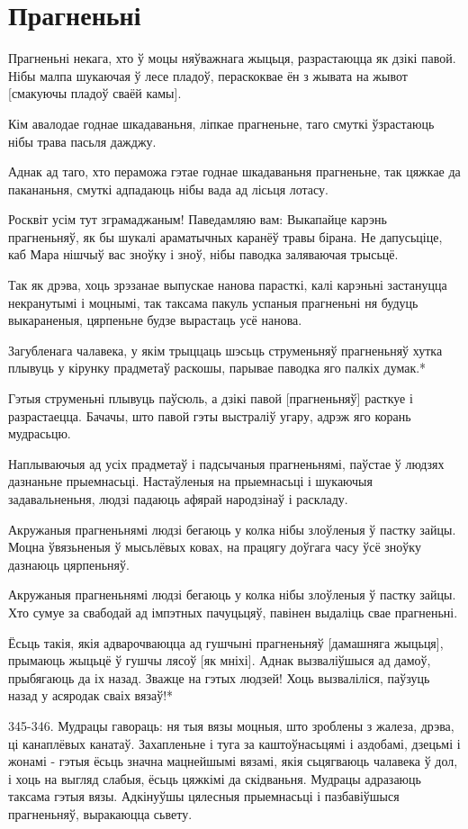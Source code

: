 \documentclass{article}
\begin{document}
\section{Прагненьні}

Прагненьні некага, хто ў моцы няўважнага жыцьця, разрастаюцца як
дзікі павой. Нібы малпа шукаючая ў лесе пладоў, пераскоквае ён з жывата
на жывот {[}смакуючы пладоў сваёй камы{]}.

Кім авалодае годнае шкадаваньня, ліпкае прагненьне, таго смуткі
ўзрастаюць нібы трава пасьля дажджу.

Аднак ад таго, хто пераможа гэтае годнае шкадаваньня прагненьне,
так цяжкае да пакананьня, смуткі адпадаюць нібы вада ад лісьця лотасу.

Росквіт усім тут зграмаджаным! Паведамляю вам: Выкапайце карэнь
прагненьняў, як бы шукалі араматычных каранёў травы бірана. Не
дапусьціце, каб Мара нішчыў вас зноўку і зноў, нібы паводка заляваючая
трысьцё.

Так як дрэва, хоць зрэзанае выпускае нанова парасткі, калі карэньні
застануцца некранутымі і моцнымі, так таксама пакуль успаныя прагненьні
ня будуць выкараненыя, цярпеньне будзе вырастаць усё нанова.

Загубленага чалавека, у якім трыццаць шэсьць струменьняў
прагненьняў хутка плывуць у кірунку прадметаў раскошы, парывае паводка
яго палкіх думак.*

Гэтыя струменьні плывуць паўсюль, а дзікі павой {[}прагненьняў{]}
расткуе і разрастаецца. Бачачы, што павой гэты выстраліў угару, адрэж
яго корань мудрасьцю.

Наплываючыя ад усіх прадметаў і падсычаныя прагненьнямі, паўстае ў
людзях дазнаньне прыемнасьці. Настаўленыя на прыемнасьці і шукаючыя
задавальненьня, людзі падаюць афярай народзінаў і раскладу.

Акружаныя прагненьнямі людзі бегаюць у колка нібы злоўленыя ў
пастку зайцы. Моцна ўвязьненыя ў мысьлёвых ковах, на працягу доўгага
часу ўсё зноўку дазнаюць цярпеньняў.

Акружаныя прагненьнямі людзі бегаюць у колка нібы злоўленыя ў
пастку зайцы. Хто сумуе за свабодай ад імпэтных пачуцьцяў, павінен
выдаліць свае прагненьні.

Ёсьць такія, якія адварочваюцца ад гушчыні прагненьняў {[}дамашняга
жыцьця{]}, прымаюць жыцьцё ў гушчы лясоў {[}як мніхі{]}. Аднак
вызваліўшыся ад дамоў, прыбягаюць да іх назад. Зважце на гэтых людзей!
Хоць вызваліліся, паўзуць назад у асяродак сваіх вязаў!*

345-346. Мудрацы гавораць: ня тыя вязы моцныя, што зроблены з жалеза,
дрэва, ці канаплёвых канатаў. Захапленьне і туга за каштоўнасьцямі і
аздобамі, дзецьмі і жонамі - гэтыя ёсьць значна мацнейшымі вязамі, якія
сьцягваюць чалавека ў дол, і хоць на выгляд слабыя, ёсьць цяжкімі да
скідваньня. Мудрацы адразаюць таксама гэтыя вязы. Адкінуўшы цялесныя
прыемнасьці і пазбавіўшыся прагненьняў, выракаюцца сьвету.
\end{document}
